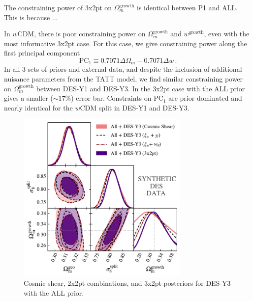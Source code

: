 The constraining power of 3x2pt on $\Omega_m^\mathrm{growth}$ is identical between P1 and ALL. This is because ...

In $w$CDM, there is poor constraining power on $\Omega_m^\mathrm{growth}$ and $w^{\mathrm{growth}}$, even with the most informative 3x2pt case. For this case, we give constraining power along the first principal component
\begin{equation}
	\mathrm{PC}_1 \equiv 0.7071\Delta\Omega_m - 0.7071\Delta w\,.
\end{equation}
In all 3 sets of priors and external data, and despite the inclusion of additional nuisance parameters from the TATT model, we find similar constraining power on $\Omega_m^\mathrm{growth}$ between DES-Y1 and DES-Y3. In the 3x2pt case with the ALL prior gives a smaller ($\sim17\%$) error bar. Constraints on $\mathrm{PC}_1$ are prior dominated and nearly identical for the $w$CDM split in DES-Y1 and DES-Y3.
\begin{figure}[ht]
	\centering
	\includegraphics[width=0.75\textwidth]{plots/plot36_S8.pdf}
	\caption{Cosmic shear, 2x2pt combinations, and 3x2pt posteriors for DES-Y3 with the ALL prior.}
	\label{fig:syn_y3_probe}
\end{figure}
